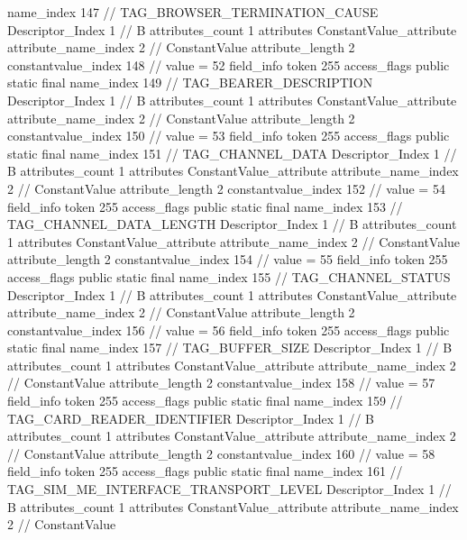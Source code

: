 {{{{{				name_index	147		// TAG_BROWSER_TERMINATION_CAUSE
				Descriptor_Index	1		// B
				attributes_count	1
				attributes {
				ConstantValue_attribute {
					attribute_name_index	2		// ConstantValue
					attribute_length	2
					constantvalue_index	148		// value = 52
				}
				}
			}
			field_info {
				token	255
				access_flags	public static final
				name_index	149		// TAG_BEARER_DESCRIPTION
				Descriptor_Index	1		// B
				attributes_count	1
				attributes {
				ConstantValue_attribute {
					attribute_name_index	2		// ConstantValue
					attribute_length	2
					constantvalue_index	150		// value = 53
				}
				}
			}
			field_info {
				token	255
				access_flags	public static final
				name_index	151		// TAG_CHANNEL_DATA
				Descriptor_Index	1		// B
				attributes_count	1
				attributes {
				ConstantValue_attribute {
					attribute_name_index	2		// ConstantValue
					attribute_length	2
					constantvalue_index	152		// value = 54
				}
				}
			}
			field_info {
				token	255
				access_flags	public static final
				name_index	153		// TAG_CHANNEL_DATA_LENGTH
				Descriptor_Index	1		// B
				attributes_count	1
				attributes {
				ConstantValue_attribute {
					attribute_name_index	2		// ConstantValue
					attribute_length	2
					constantvalue_index	154		// value = 55
				}
				}
			}
			field_info {
				token	255
				access_flags	public static final
				name_index	155		// TAG_CHANNEL_STATUS
				Descriptor_Index	1		// B
				attributes_count	1
				attributes {
				ConstantValue_attribute {
					attribute_name_index	2		// ConstantValue
					attribute_length	2
					constantvalue_index	156		// value = 56
				}
				}
			}
			field_info {
				token	255
				access_flags	public static final
				name_index	157		// TAG_BUFFER_SIZE
				Descriptor_Index	1		// B
				attributes_count	1
				attributes {
				ConstantValue_attribute {
					attribute_name_index	2		// ConstantValue
					attribute_length	2
					constantvalue_index	158		// value = 57
				}
				}
			}
			field_info {
				token	255
				access_flags	public static final
				name_index	159		// TAG_CARD_READER_IDENTIFIER
				Descriptor_Index	1		// B
				attributes_count	1
				attributes {
				ConstantValue_attribute {
					attribute_name_index	2		// ConstantValue
					attribute_length	2
					constantvalue_index	160		// value = 58
				}
				}
			}
			field_info {
				token	255
				access_flags	public static final
				name_index	161		// TAG_SIM_ME_INTERFACE_TRANSPORT_LEVEL
				Descriptor_Index	1		// B
				attributes_count	1
				attributes {
				ConstantValue_attribute {
					attribute_name_index	2		// ConstantValue
}}}}}}}
